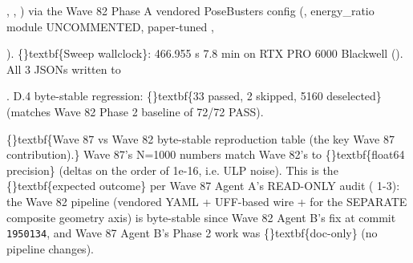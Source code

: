 \documentclass{article}
\begin{document}
, , ) via the Wave 82 Phase A vendored PoseBusters config (, energy\_ratio module UNCOMMENTED, paper-tuned ,

). \{\}textbf\{Sweep wallclock\}: 466.955 s  7.8 min on RTX PRO 6000 Blackwell (). All 3 JSONs written to

. D.4 byte-stable regression: \{\}textbf\{33 passed, 2 skipped, 5160 deselected\} (matches Wave 82 Phase 2 baseline of 72/72 PASS).

\begin{table}[ht]
\centering
\small
{}%
\end{table}

\{\}textbf\{Wave 87 vs Wave 82 byte-stable reproduction table (the key Wave 87 contribution).\} Wave 87's N=1000 numbers match Wave 82's to \{\}textbf\{float64 precision\} (deltas on the order of 1e-16, i.e. ULP noise). This is the \{\}textbf\{expected outcome\} per Wave 87 Agent A's READ-ONLY audit ( 1-3): the Wave 82 pipeline (vendored YAML + UFF-based  wire +  for the SEPARATE composite geometry axis) is byte-stable since Wave 82 Agent B's fix at commit \texttt{1950134}, and Wave 87 Agent B's Phase 2 work was \{\}textbf\{doc-only\} (no pipeline changes).
\end{document}
